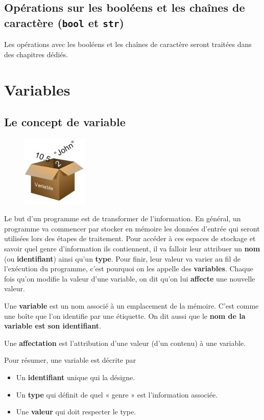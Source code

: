 \documentclass[11pt, a4paper]{book}
\begin{document}
\subsection{Opérations sur les booléens et les chaînes de caractère (\lstinline{bool} et \lstinline{str})}
Les opérations avec les booléens et les chaînes de caractère seront traitées dans des chapitres dédiés.


\section{Variables}


\subsection{Le concept de variable}
\begin{figure}
	\includegraphics[trim=0 0 0 45,width=0.28\textwidth]{images/variables/variables}
\end{figure}
Le but d'un programme est de transformer de l'information. En général, un programme va commencer par stocker en mémoire les données d’entrée qui seront utilisées lors des étapes de traitement. Pour accéder à ces espaces de stockage et savoir quel genre d'information ils contiennent, il va falloir leur attribuer un \textbf{nom} (ou \textbf{identifiant}) ainsi qu'un \textbf{type}. Pour finir, leur valeur va varier au fil de l'exécution du programme, c'est pourquoi on les appelle des \textbf{variables}. Chaque fois qu'on modifie la valeur d'une variable, on dit qu'on lui \textbf{affecte} une nouvelle valeur.
\begin{mydefinitions}
	\item  Une \textbf{variable} est un nom associé à un emplacement de la mémoire. C’est comme une boîte que l’on identifie par une étiquette. On dit aussi que le \textbf{nom de la variable est son identifiant}.
	\item Une \textbf{affectation} est l’attribution d’une valeur (d’un contenu) à une variable.
\end{mydefinitions}
Pour résumer, une variable est décrite par
\begin{itemize}
	\item Un \textbf{identifiant} unique qui la désigne.
	\item Un \textbf{type} qui définit de quel « genre » est l’information associée.
	\item Une \textbf{valeur} qui doit respecter le type.
\end{itemize}
\end{document}
